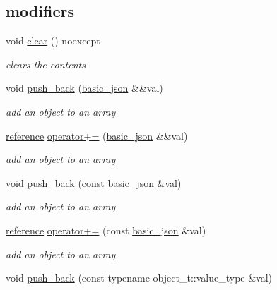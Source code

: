 \subsection*{modifiers}
\begin{DoxyCompactItemize}
\item 
void \hyperlink{classnlohmann_1_1basic__json_abfeba47810ca72f2176419942c4e1952}{clear} () noexcept
\begin{DoxyCompactList}\small\item\em clears the contents \end{DoxyCompactList}\item 
void \hyperlink{classnlohmann_1_1basic__json_ac8e523ddc8c2dd7e5d2daf0d49a9c0d7}{push\+\_\+back} (\hyperlink{classnlohmann_1_1basic__json}{basic\+\_\+json} \&\&val)
\begin{DoxyCompactList}\small\item\em add an object to an array \end{DoxyCompactList}\item 
\hyperlink{classnlohmann_1_1basic__json_ac6a5eddd156c776ac75ff54cfe54a5bc}{reference} \hyperlink{classnlohmann_1_1basic__json_aea1085f2d35cc0e1ce119cf0110119e6}{operator+=} (\hyperlink{classnlohmann_1_1basic__json}{basic\+\_\+json} \&\&val)
\begin{DoxyCompactList}\small\item\em add an object to an array \end{DoxyCompactList}\item 
void \hyperlink{classnlohmann_1_1basic__json_ab4384af330b79de0e5f279576803a2c7}{push\+\_\+back} (const \hyperlink{classnlohmann_1_1basic__json}{basic\+\_\+json} \&val)
\begin{DoxyCompactList}\small\item\em add an object to an array \end{DoxyCompactList}\item 
\hyperlink{classnlohmann_1_1basic__json_ac6a5eddd156c776ac75ff54cfe54a5bc}{reference} \hyperlink{classnlohmann_1_1basic__json_adc29dd6358ff7a9062d7e168c24e7484}{operator+=} (const \hyperlink{classnlohmann_1_1basic__json}{basic\+\_\+json} \&val)
\begin{DoxyCompactList}\small\item\em add an object to an array \end{DoxyCompactList}\item 
void \hyperlink{classnlohmann_1_1basic__json_ae11a3a51782c058fff2f6550cdfb9b3c}{push\+\_\+back} (const typename object\+\_\+t\+::value\+\_\+type \&val)

\end{DoxyCompactItemize}
